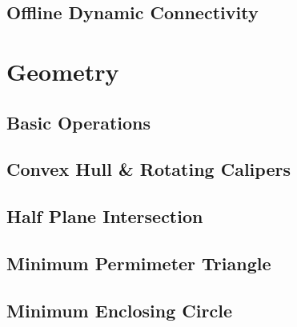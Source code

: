 \documentclass[9pt,landscape,a4paper,twocolumn]{extarticle}
\begin{document}
\subsection{Offline Dynamic Connectivity}


% 

\section{Geometry}

\subsection{Basic Operations}


% 

\subsection{Convex Hull \& Rotating Calipers}


\subsection{Half Plane Intersection}


\subsection{Minimum Permimeter Triangle}


\subsection{Minimum Enclosing Circle}

\end{document}

